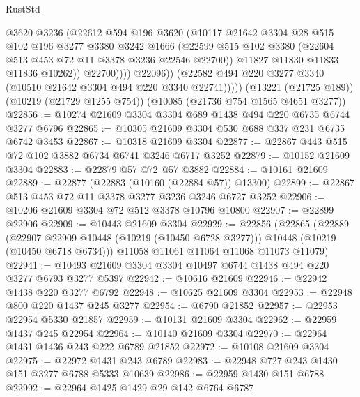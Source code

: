 \begin{lexlean}{RustStd}
\begin{coremodule}
                      @3620
                      @3236
                      (@22612
                        @594
                        @196
                        @3620
                        (@10117
                          @21642
                          @3304
                          @28
                          @515
                          @102
                          @196
                          @3277
                          @3380
                          @3242
                          @1666
                          (@22599
                            @515
                            @102
                            @3380
                            (@22604 @513 @453 @72 @11 @3378 @3236 @22546 @22700))
                          @11827
                          @11830
                          @11833
                          @11836
                          @10262))
                      @22700))))
              @22096))
          (@22582 @494 @220 @3277 @3340 (@10510 @21642 @3304 @494 @220 @3340 @22741)))))
    (@13221 (@21725 @189))
    (@10219 (@21729 @1255 @754))
    (@10085 (@21736 @754 @1565 @4651 @3277))
@22856 := @10274 @21609 @3304 @3304 @689 @1438 @494 @220 @6735 @6744 @3277 @6796
@22865 := @10305 @21609 @3304 @530 @688 @337 @231 @6735 @6742 @3453
@22867 := @10318 @21609 @3304
@22877 := @22867 @443 @515 @72 @102 @3882 @6734 @6741 @3246 @6717 @3252
@22879 := @10152 @21609 @3304
@22883 := @22879 @57 @72 @57 @3882
@22884 := @10161 @21609
@22889 := @22877 (@22883 (@10160 (@22884 @57)) @13300)
@22899 := @22867 @513 @453 @72 @11 @3378 @3277 @3236 @3246 @6727 @3252
@22906 := @10206 @21609 @3304 @72 @512 @3378 @10796 @10800
@22907 := @22899 @22906
@22909 := @10443 @21609 @3304
@22929 := @22856
    (@22865
      (@22889
        (@22907 @22909 @10448 (@10219 (@10450 @6728 @3277)))
        @10448
        (@10219 (@10450 @6718 @6734)))
      @11058
      @11061
      @11064
      @11068
      @11073
      @11079)
@22941 := @10493 @21609 @3304 @3304 @10497 @6744 @1438 @494 @220 @3277 @6793 @3277 @5397
@22942 := @10616 @21609
@22946 := @22942 @1438 @220 @3277 @6792
@22948 := @10625 @21609 @3304
@22953 := @22948 @800 @220 @1437 @245 @3277
@22954 := @6790 @21852
@22957 := @22953 @22954 @5330 @21857
@22959 := @10131 @21609 @3304
@22962 := @22959 @1437 @245 @22954
@22964 := @10140 @21609 @3304
@22970 := @22964 @1431 @1436 @243 @222 @6789 @21852
@22972 := @10108 @21609 @3304
@22975 := @22972 @1431 @243 @6789
@22983 := @22948 @727 @243 @1430 @151 @3277 @6788 @5333 @10639
@22986 := @22959 @1430 @151 @6788
@22992 := @22964 @1425 @1429 @29 @142 @6764 @6787

\end{coremodule}
\end{lexlean}
